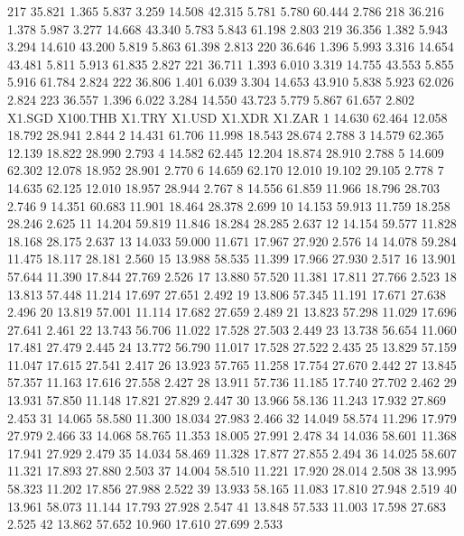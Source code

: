 \documentclass[a4paper,11pt]{scrartcl}
\begin{document}
\begin{Schunk}
\begin{Soutput}
217 35.821  1.365  5.837  3.259 14.508   42.315  5.781  5.780   60.444  2.786
218 36.216  1.378  5.987  3.277 14.668   43.340  5.783  5.843   61.198  2.803
219 36.356  1.382  5.943  3.294 14.610   43.200  5.819  5.863   61.398  2.813
220 36.646  1.396  5.993  3.316 14.654   43.481  5.811  5.913   61.835  2.827
221 36.711  1.393  6.010  3.319 14.755   43.553  5.855  5.916   61.784  2.824
222 36.806  1.401  6.039  3.304 14.653   43.910  5.838  5.923   62.026  2.824
223 36.557  1.396  6.022  3.284 14.550   43.723  5.779  5.867   61.657  2.802
    X1.SGD X100.THB X1.TRY X1.USD X1.XDR X1.ZAR
1   14.630   62.464 12.058 18.792 28.941  2.844
2   14.431   61.706 11.998 18.543 28.674  2.788
3   14.579   62.365 12.139 18.822 28.990  2.793
4   14.582   62.445 12.204 18.874 28.910  2.788
5   14.609   62.302 12.078 18.952 28.901  2.770
6   14.659   62.170 12.010 19.102 29.105  2.778
7   14.635   62.125 12.010 18.957 28.944  2.767
8   14.556   61.859 11.966 18.796 28.703  2.746
9   14.351   60.683 11.901 18.464 28.378  2.699
10  14.153   59.913 11.759 18.258 28.246  2.625
11  14.204   59.819 11.846 18.284 28.285  2.637
12  14.154   59.577 11.828 18.168 28.175  2.637
13  14.033   59.000 11.671 17.967 27.920  2.576
14  14.078   59.284 11.475 18.117 28.181  2.560
15  13.988   58.535 11.399 17.966 27.930  2.517
16  13.901   57.644 11.390 17.844 27.769  2.526
17  13.880   57.520 11.381 17.811 27.766  2.523
18  13.813   57.448 11.214 17.697 27.651  2.492
19  13.806   57.345 11.191 17.671 27.638  2.496
20  13.819   57.001 11.114 17.682 27.659  2.489
21  13.823   57.298 11.029 17.696 27.641  2.461
22  13.743   56.706 11.022 17.528 27.503  2.449
23  13.738   56.654 11.060 17.481 27.479  2.445
24  13.772   56.790 11.017 17.528 27.522  2.435
25  13.829   57.159 11.047 17.615 27.541  2.417
26  13.923   57.765 11.258 17.754 27.670  2.442
27  13.845   57.357 11.163 17.616 27.558  2.427
28  13.911   57.736 11.185 17.740 27.702  2.462
29  13.931   57.850 11.148 17.821 27.829  2.447
30  13.966   58.136 11.243 17.932 27.869  2.453
31  14.065   58.580 11.300 18.034 27.983  2.466
32  14.049   58.574 11.296 17.979 27.979  2.466
33  14.068   58.765 11.353 18.005 27.991  2.478
34  14.036   58.601 11.368 17.941 27.929  2.479
35  14.034   58.469 11.328 17.877 27.855  2.494
36  14.025   58.607 11.321 17.893 27.880  2.503
37  14.004   58.510 11.221 17.920 28.014  2.508
38  13.995   58.323 11.202 17.856 27.988  2.522
39  13.933   58.165 11.083 17.810 27.948  2.519
40  13.961   58.073 11.144 17.793 27.928  2.547
41  13.848   57.533 11.003 17.598 27.683  2.525
42  13.862   57.652 10.960 17.610 27.699  2.533

\end{Soutput}
\end{Schunk}
\end{document}

